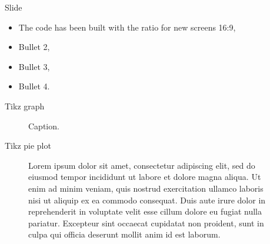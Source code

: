 



 
 
 
 
 

 
 




\ifx\currentAspect\oldAspect
	\def\sometext{The code has been built with the ratio for old screens 4:3}
\else
	\def\sometext{The code has been built with the ratio for new screens 16:9}
\fi



\begin{frame}{Slide }
\begin{itemize}
\setlength\itemsep{\fill}
\item \sometext,
\item Bullet 2,
\item Bullet 3,
\item Bullet 4.
\end{itemize}
\end{frame}


\begin{frame}{Tikz graph}
\begin{figure}[H]
\centering


\vspace{-10pt}
\caption{Caption.}
\end{figure}
\end{frame}

\begin{frame}{Tikz pie plot}
\ifx\currentAspect\oldAspect
	\vspace{-20pt}
\else
	\vspace{-5pt}
\fi
\begin{figure}[H]
\centering


\ifx\currentAspect\oldAspect
	\vspace{-15pt}
\else
	\vspace{-5pt}
\fi

\caption{Lorem ipsum dolor sit amet, consectetur adipiscing elit, sed do eiusmod tempor incididunt ut labore et dolore magna aliqua. Ut enim ad minim veniam, quis nostrud exercitation ullamco laboris nisi ut aliquip ex ea commodo consequat. Duis aute irure dolor in reprehenderit in voluptate velit esse cillum dolore eu fugiat nulla pariatur. Excepteur sint occaecat cupidatat non proident, sunt in culpa qui officia deserunt mollit anim id est laborum.}
\end{figure}
\end{frame}


